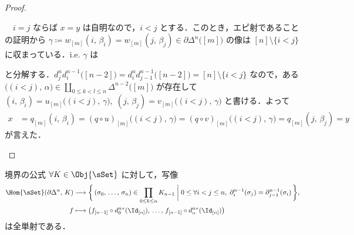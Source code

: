 \documentclass[TQFT_main]{subfiles}
\begin{document}
\begin{proof}
\begin{description}
        　$i=j$ ならば $x = y$ は自明なので，$i < j$ とする．このとき，エピ射であることの証明から $\gamma \coloneqq w_{[m]} (i,\, \beta_i) = w_{[m]} (j,\, \beta_j) \in \partial \Delta^n \bigl( [m] \bigr)$ の像は $[n] \setminus \{i < j\}$ に収まっている．i.e. $\gamma$ は
        \begin{center}
        \end{center}
        と分解する．$d^n_j d^{n-1}_i \bigl( [n-2] \bigr) = d^n_i d^{n-1}_{j-1} \bigl( [n-2] \bigr) = {[n]} \setminus \{i < j\}$ なので，ある $\bigl( (i < j),\, \alpha \bigr) \in \coprod_{0 \le k < l \le n} \Delta^{n-2} \bigl( [m] \bigr)$ が存在して $(i,\, \beta_i) = u_{[m]} \bigl((i < j),\, \gamma\bigr),\; (j,\, \beta_j) = v_{[m]} \bigl((i < j),\, \gamma\bigr)$ と書ける．よって
        \begin{align}
            x &= q_{[m]} (i,\, \beta_i) = (q \circ u)_{[m]} \bigl( (i < j),\, \gamma \bigr) = (q \circ v)_{[m]} \bigl( (i < j),\, \gamma \bigr) = q_{[m]} (j,\, \beta_j) = y
        \end{align}
        が言えた．
    \end{description}
\end{proof}

\begin{mycol}[label=col:coundary-coeq]{境界の公式}
    $\forall K \in \Obj{\sSet}$ に対して，写像
    \begin{align}
        \Hom{\sSet} (\partial \Delta^n,\, K) &\lto \biggl\{\, (\sigma_0,\, \dots,\, \sigma_n) \in \prod_{0 \le k \le n} K_{n-1} \biggm| 0 \le \forall i < j \le n,\;  \partial^{n-1}_i (\sigma_j) = \partial^{n-1}_{j-1} (\sigma_i) \,\biggr\}, \\
        f &\lmto \bigl(f_{[n-1]} \circ d^n_0{}^*(\Id_{[n]}),\, \dots,\, f_{[n-1]} \circ d^n_n{}^*(\Id_{[n]}) \bigr) 
    \end{align}
    は全単射である．
\end{mycol}
\end{document}

